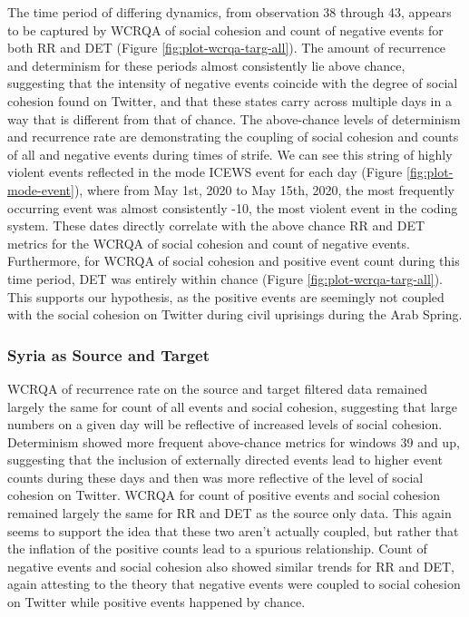 \documentclass[english,man]{apa6}
\begin{document}
The time period of differing dynamics, from observation 38 through 43, appears to be captured by WCRQA of social cohesion and count of negative events for both RR and DET (Figure \ref{fig:plot-wcrqa-targ-all}). The amount of recurrence and determinism for these periods almost consistently lie above chance, suggesting that the intensity of negative events coincide with the degree of social cohesion found on Twitter, and that these states carry across multiple days in a way that is different from that of chance.
The above-chance levels of determinism and recurrence rate are demonstrating the coupling of social cohesion and counts of all and negative events during times of strife. We can see this string of highly violent events reflected in the mode ICEWS event for each day (Figure \ref{fig:plot-mode-event}), where from May 1st, 2020 to May 15th, 2020, the most frequently occurring event was almost consistently -10, the most violent event in the coding system. These dates directly correlate with the above chance RR and DET metrics for the WCRQA of social cohesion and count of negative events. Furthermore, for WCRQA of social cohesion and positive event count during this time period, DET was entirely within chance (Figure \ref{fig:plot-wcrqa-targ-all}). This supports our hypothesis, as the positive events are seemingly not coupled with the social cohesion on Twitter during civil uprisings during the Arab Spring.

\hypertarget{syria-as-source-and-target-3}{%
\subsubsection{Syria as Source and Target}\label{syria-as-source-and-target-3}}

WCRQA of recurrence rate on the source and target filtered data remained largely the same for count of all events and social cohesion, suggesting that large numbers on a given day will be reflective of increased levels of social cohesion. Determinism showed more frequent above-chance metrics for windows 39 and up, suggesting that the inclusion of externally directed events lead to higher event counts during these days and then was more reflective of the level of social cohesion on Twitter. WCRQA for count of positive events and social cohesion remained largely the same for RR and DET as the source only data. This again seems to support the idea that these two aren't actually coupled, but rather that the inflation of the positive counts lead to a spurious relationship. Count of negative events and social cohesion also showed similar trends for RR and DET, again attesting to the theory that negative events were coupled to social cohesion on Twitter while positive events happened by chance.
\end{document}
